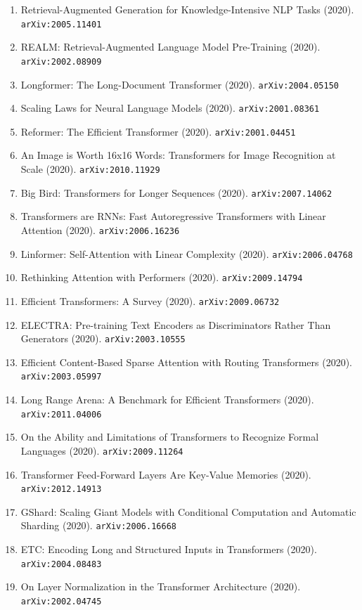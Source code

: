\documentclass[11pt]{article}
\begin{document}
\begin{enumerate}
  \item Retrieval-Augmented Generation for Knowledge-Intensive NLP Tasks (2020). \texttt{arXiv:2005.11401}
  \item REALM: Retrieval-Augmented Language Model Pre-Training (2020). \texttt{arXiv:2002.08909}
  \item Longformer: The Long-Document Transformer (2020). \texttt{arXiv:2004.05150}
  \item Scaling Laws for Neural Language Models (2020). \texttt{arXiv:2001.08361}
  \item Reformer: The Efficient Transformer (2020). \texttt{arXiv:2001.04451}
  \item An Image is Worth 16x16 Words: Transformers for Image Recognition at
  Scale (2020). \texttt{arXiv:2010.11929}
  \item Big Bird: Transformers for Longer Sequences (2020). \texttt{arXiv:2007.14062}
  \item Transformers are RNNs: Fast Autoregressive Transformers with Linear
  Attention (2020). \texttt{arXiv:2006.16236}
  \item Linformer: Self-Attention with Linear Complexity (2020). \texttt{arXiv:2006.04768}
  \item Rethinking Attention with Performers (2020). \texttt{arXiv:2009.14794}
  \item Efficient Transformers: A Survey (2020). \texttt{arXiv:2009.06732}
  \item ELECTRA: Pre-training Text Encoders as Discriminators Rather Than
  Generators (2020). \texttt{arXiv:2003.10555}
  \item Efficient Content-Based Sparse Attention with Routing Transformers (2020). \texttt{arXiv:2003.05997}
  \item Long Range Arena: A Benchmark for Efficient Transformers (2020). \texttt{arXiv:2011.04006}
  \item On the Ability and Limitations of Transformers to Recognize Formal
  Languages (2020). \texttt{arXiv:2009.11264}
  \item Transformer Feed-Forward Layers Are Key-Value Memories (2020). \texttt{arXiv:2012.14913}
  \item GShard: Scaling Giant Models with Conditional Computation and Automatic
  Sharding (2020). \texttt{arXiv:2006.16668}
  \item ETC: Encoding Long and Structured Inputs in Transformers (2020). \texttt{arXiv:2004.08483}
  \item On Layer Normalization in the Transformer Architecture (2020). \texttt{arXiv:2002.04745}

\end{enumerate}
\end{document}
